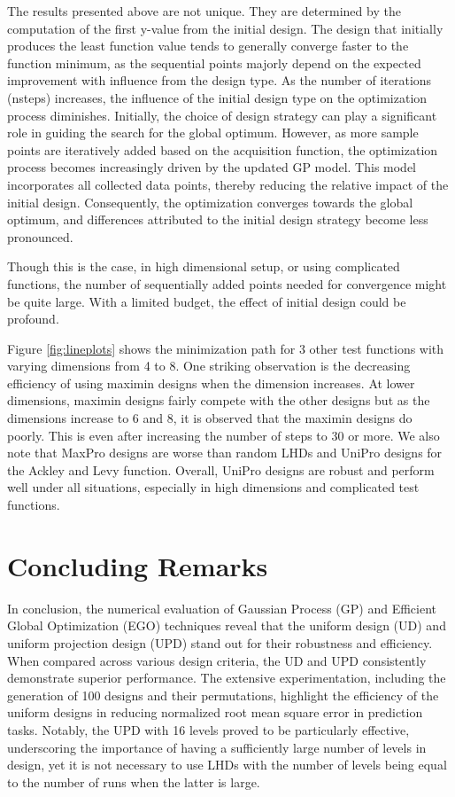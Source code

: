 \documentclass [PhD] {package/uclathes}
\begin{document}
The results presented above are not unique. They are determined by the computation of the first y-value from the initial design. The design that initially produces the least function value tends to generally converge faster to the function minimum, as the sequential points majorly depend on the expected improvement with influence from the design type.
As the number of iterations (nsteps) increases, the influence of the initial design type on the optimization process diminishes. Initially, the choice of design strategy can play a significant role in guiding the search for the global optimum. However, as more sample points are iteratively added based on the acquisition function, the optimization process becomes increasingly driven by the updated GP model. This model incorporates all collected data points, thereby reducing the relative impact of the initial design. Consequently, the optimization converges towards the global optimum, and differences attributed to the initial design strategy become less pronounced.

Though this is the case, in high dimensional setup, or using complicated functions, the number of sequentially added points needed for convergence might be quite large. With a limited budget, the effect of initial design could be profound.

Figure \ref{fig:lineplots} shows the minimization path for 3 other test functions with varying dimensions from 4 to 8.
One striking observation is the decreasing efficiency of using maximin designs when the dimension increases. At lower dimensions,  maximin designs fairly compete with the other designs but as the dimensions increase to 6 and 8, it is observed that the maximin designs do poorly. This is even after increasing the number of steps to 30 or more. We also note that  MaxPro designs are  worse than  random LHDs and UniPro designs for the Ackley and Levy function. Overall, UniPro designs are robust and perform well under all situations, especially in high dimensions and complicated test functions.

\section{Concluding Remarks}
In conclusion, the numerical evaluation of Gaussian Process (GP) and Efficient Global Optimization (EGO) techniques reveal that the uniform design (UD) and uniform projection  design (UPD)  stand out for their robustness and efficiency. When compared across various design criteria, the UD and UPD consistently demonstrate superior performance. The extensive experimentation, including the generation of 100 designs and their permutations, highlight the efficiency of the uniform designs in reducing normalized root mean square error in prediction tasks.
Notably, the UPD with 16 levels proved to be particularly effective, underscoring the importance of having a sufficiently large number of levels in design, yet it is not necessary to use LHDs with the number of levels being equal to the number of runs when the latter is large.
\end{document}
